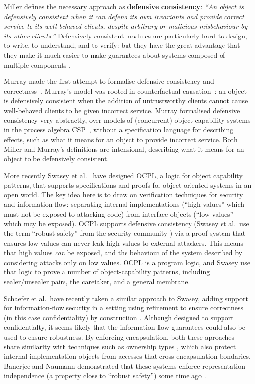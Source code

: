 Miller \cite{miller-esop2013,MillerPhD} defines the necessary approach
as \textbf{defensive consistency}: \textit{``An object is defensively
  consistent when it can defend its own invariants and provide correct
  service to its well behaved clients, despite arbitrary or malicious
  misbehaviour by its other clients.''}  Defensively consistent
modules are particularly hard to design, to write, to understand, and
to verify: but they have the great advantage that they make it much
easier to make guarantees about systems composed of multiple components
\cite{Murray10dphil}.

Murray made the first attempt to formalise defensive consistency and
correctness~\cite{Murray10dphil}.  Murray's model was rooted in
counterfactual causation~\cite{Lewis_73}: an object is defensively
consistent when the addition of untrustworthy clients cannot cause
well-behaved clients to be given incorrect service.  Murray formalised
defensive consistency very abstractly, over models of (concurrent)
object-capability systems in the process algebra CSP~\cite{Hoare:CSP},
without a specification language for describing effects, such as what
it means for an object to provide incorrect service.  Both Miller and
Murray's definitions are intensional, describing what it means for an
object to be defensively consistent.


 
More recently Swasey et al.\ \cite{ddd} have designed OCPL, a logic
for object capability patterns, that supports specifications and
proofs for object-oriented systems in an open world.  The key idea
here is to draw on verification techniques for security and
information flow: separating internal implementations (``high values''
which must not be exposed to attacking code) from interface objects
(``low values'' which may be exposed).  OCPL supports defensive
consistency (Swasey et al.\ use the term ``robust safety'' from the
security community \cite{Bengtson}) via a proof system that ensures
low values can never leak high values to external attackers. This
means that high values \textit{can} be exposed, and the behaviour of
the system described by considering attacks only on low values.  OCPL
is a program logic, and Swasey use that logic to prove a number of
object-capability patterns, including sealer/unsealer pairs, the
caretaker, and a general membrane. 

Schaefer et al.\ have recently taken a similar approach to Swasey,
adding support for information-flow security in a setting using
refinement to ensure correctness (in this case confidentiality) by
construction \cite{schaeferCbC}. Although designed to support
confidentialty, it seems likely that the information-flow guarantees
could also be used to ensure robustness.  By enforcing encapsulation,
both these aproaches share similarity with techniques such as
ownership types \cite{ClaPotNobOOPSLA98,NobPotVitECOOP98}, which also
protect internal implementation objects from accesses that cross
encapsulation bondaries.  Banerjee and Naumann demonstrated that these
systems enforce representation independence (a property close to
``robust safety'') some time ago \cite{Banerjee:2005}.

